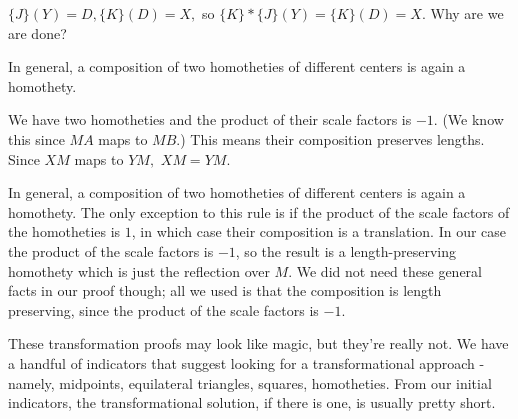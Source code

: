 







$\{J\} (Y) = D, \{K\} (D) = X,$ so $\{K\} * \{J\} (Y) = \{K\} (D) = X$. Why are we are done?

In general, a composition of two homotheties of different centers is again a homothety.



We have two homotheties and the product of their scale factors is $-1.$  (We know this since $MA$ maps to $MB.$)  This means their composition preserves lengths.  Since $XM$ maps to $YM,$ $XM=YM.$

In general, a composition of two homotheties of different centers is again a homothety. The only exception to this rule is if the product of the scale factors of the homotheties is $1$, in which case their composition is a translation. In our case the product of the scale factors is $-1$, so the result is a length-preserving homothety which is just the reflection over $M$. We did not need these general facts in our proof though; all we used is that the composition is length preserving, since the product of the scale factors is $-1$.

These transformation proofs may look like magic, but they're really not.  We have a handful of indicators that suggest looking for a transformational approach - namely, midpoints, equilateral triangles, squares, homotheties.  From our initial indicators, the transformational solution, if there is one, is usually pretty short.

